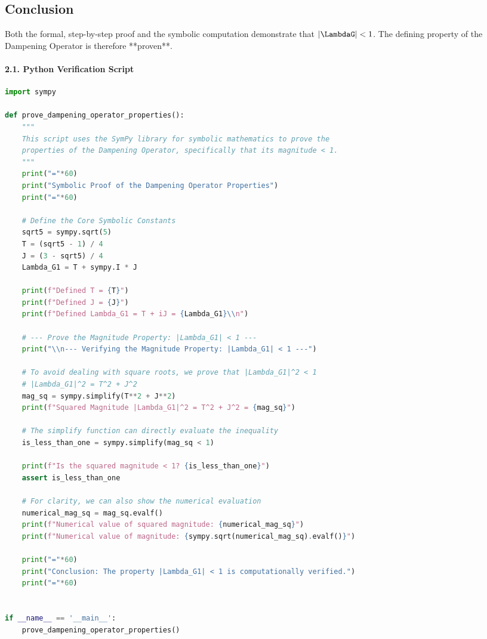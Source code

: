 \subsection*{Conclusion}
Both the formal, step-by-step proof and the symbolic computation demonstrate that $|\LambdaG| < 1$. The defining property of the Dampening Operator is therefore **proven**.
\newpage
\newpage

\paragraph{2.1. Python Verification Script}
\begin{lstlisting}[language=Python, caption={Python script to symbolically prove the properties of the Dampening Operator.}, label={lst:dampening_op_proof}]
import sympy

def prove_dampening_operator_properties():
    """
    This script uses the SymPy library for symbolic mathematics to prove the
    properties of the Dampening Operator, specifically that its magnitude < 1.
    """
    print("="*60)
    print("Symbolic Proof of the Dampening Operator Properties")
    print("="*60)

    # Define the Core Symbolic Constants
    sqrt5 = sympy.sqrt(5)
    T = (sqrt5 - 1) / 4
    J = (3 - sqrt5) / 4
    Lambda_G1 = T + sympy.I * J

    print(f"Defined T = {T}")
    print(f"Defined J = {J}")
    print(f"Defined Lambda_G1 = T + iJ = {Lambda_G1}\\n")

    # --- Prove the Magnitude Property: |Lambda_G1| < 1 ---
    print("\\n--- Verifying the Magnitude Property: |Lambda_G1| < 1 ---")

    # To avoid dealing with square roots, we prove that |Lambda_G1|^2 < 1
    # |Lambda_G1|^2 = T^2 + J^2
    mag_sq = sympy.simplify(T**2 + J**2)
    print(f"Squared Magnitude |Lambda_G1|^2 = T^2 + J^2 = {mag_sq}")

    # The simplify function can directly evaluate the inequality
    is_less_than_one = sympy.simplify(mag_sq < 1)

    print(f"Is the squared magnitude < 1? {is_less_than_one}")
    assert is_less_than_one

    # For clarity, we can also show the numerical evaluation
    numerical_mag_sq = mag_sq.evalf()
    print(f"Numerical value of squared magnitude: {numerical_mag_sq}")
    print(f"Numerical value of magnitude: {sympy.sqrt(numerical_mag_sq).evalf()}")

    print("="*60)
    print("Conclusion: The property |Lambda_G1| < 1 is computationally verified.")
    print("="*60)


if __name__ == '__main__':
    prove_dampening_operator_properties()
\end{lstlisting}

